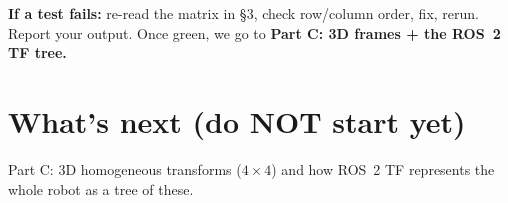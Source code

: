 \documentclass[11pt]{article}
\begin{document}
\textbf{If a test fails:} re-read the matrix in \S3, check row/column order, fix,
rerun. Report your output. Once green, we go to \textbf{Part C: 3D frames + the
ROS~2 TF tree.}

\section*{What's next (do NOT start yet)}
Part C: 3D homogeneous transforms ($4\times 4$) and how ROS~2 TF represents the
whole robot as a tree of these.
\end{document}
